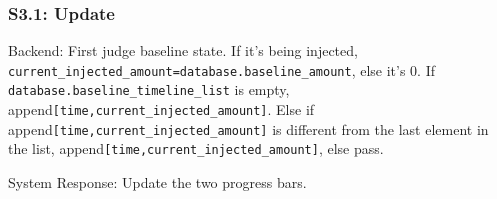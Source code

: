 \documentclass{article}
\begin{document}
\subsubsection*{S3.1: Update}
Backend: First judge baseline state. If it's being injected, \lstinline!current_injected_amount=database.baseline_amount!, else it's 0.
If \lstinline!database.baseline_timeline_list! is empty, append\lstinline![time,current_injected_amount]!.
Else if append\lstinline![time,current_injected_amount]! is different from the last element in the list, append\lstinline![time,current_injected_amount]!, else pass.

System Response: Update the two progress bars.
\end{document}
